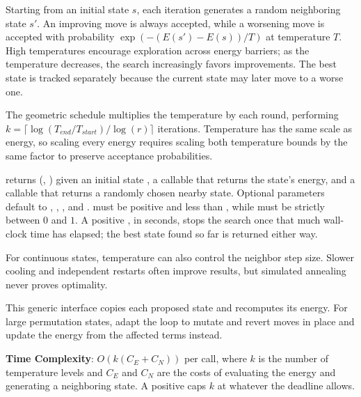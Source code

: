 Starting from an initial state $s$, each iteration generates a random neighboring state $s'$. An improving move is always accepted, while a worsening move is accepted with probability $\exp(-(E(s') - E(s))/T)$ at temperature $T$. High temperatures encourage exploration across energy barriers; as the temperature decreases, the search increasingly favors improvements. The best state is tracked separately because the current state may later move to a worse one.

The geometric schedule multiplies the temperature by  each round, performing $k = \lceil \log(T_{end}/T_{start}) / \log(r) \rceil$ iterations. Temperature has the same scale as energy, so scaling every energy requires scaling both temperature bounds by the same factor to preserve acceptance probabilities.

\begin{compactitem}
  \item {} returns (, ) given an initial state , a callable  that returns the state's energy, and a callable  that returns a randomly chosen nearby state. Optional parameters default to , , , and .  must be positive and less than , while  must be strictly between $0$ and $1$. A positive , in seconds, stops the search once that much wall-clock time has elapsed; the best state found so far is returned either way.
\end{compactitem}

For continuous states, temperature can also control the neighbor step size. Slower cooling and independent restarts often improve results, but simulated annealing never proves optimality.

This generic interface copies each proposed state and recomputes its energy. For large permutation states, adapt the loop to mutate and revert moves in place and update the energy from the affected terms instead.

\textbf{Time Complexity}: $O(k(C_E + C_N))$ per call, where $k$ is the number of temperature levels and $C_E$ and $C_N$ are the costs of evaluating the energy and generating a neighboring state. A positive  caps $k$ at whatever the deadline allows.

